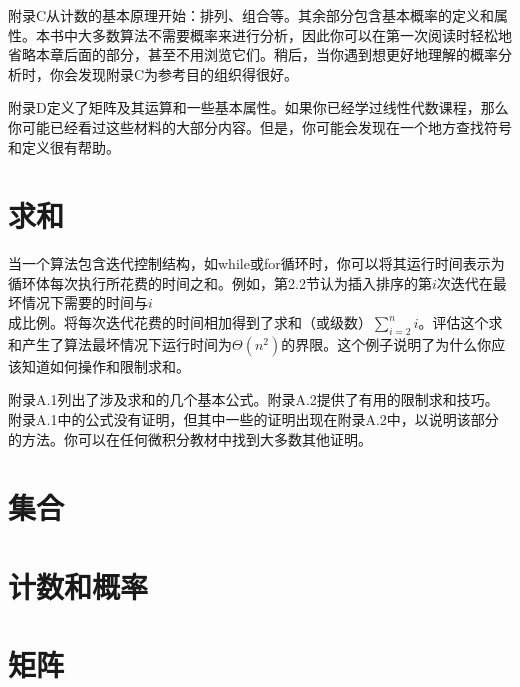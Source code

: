 \documentclass[lang=cn,newtx,10pt,scheme=chinese]{elegantbook}
\begin{document}
附录C从计数的基本原理开始：排列、组合等。其余部分包含基本概率的定义和属性。本书中大多数算法不需要概率来进行分析，因此你可以在第一次阅读时轻松地省略本章后面的部分，甚至不用浏览它们。稍后，当你遇到想更好地理解的概率分析时，你会发现附录C为参考目的组织得很好。

附录D定义了矩阵及其运算和一些基本属性。如果你已经学过线性代数课程，那么你可能已经看过这些材料的大部分内容。但是，你可能会发现在一个地方查找符号和定义很有帮助。

\chapter*{求和}

当一个算法包含迭代控制结构，如while或for循环时，你可以将其运行时间表示为循环体每次执行所花费的时间之和。例如，第2.2节认为插入排序的第$i$次迭代在最坏情况下需要的时间与$i$成比例。将每次迭代花费的时间相加得到了求和（或级数）$\sum_{i=2}^n i$。评估这个求和产生了算法最坏情况下运行时间为$\Theta\left(n^2\right)$的界限。这个例子说明了为什么你应该知道如何操作和限制求和。

附录A.1列出了涉及求和的几个基本公式。附录A.2提供了有用的限制求和技巧。附录A.1中的公式没有证明，但其中一些的证明出现在附录A.2中，以说明该部分的方法。你可以在任何微积分教材中找到大多数其他证明。

\chapter*{集合}

\chapter*{计数和概率}

\chapter*{矩阵}
\end{document}
